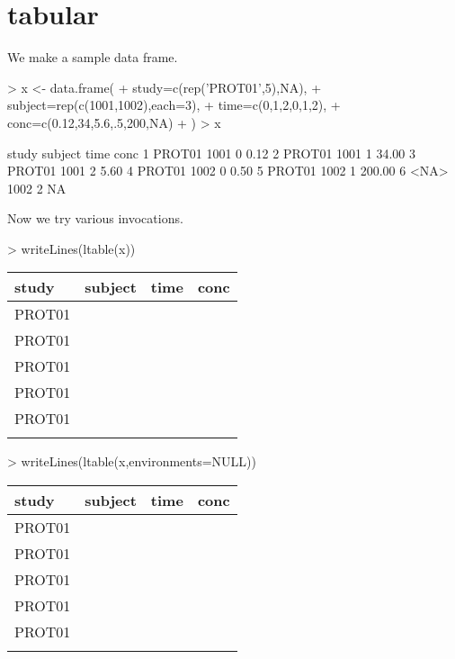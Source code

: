 \documentclass[titlepage]{article}
\begin{document}
\section*{tabular}
We make a sample data frame.
\begin{Schunk}
\begin{Sinput}
> x <- data.frame(
+   study=c(rep('PROT01',5),NA),
+   subject=rep(c(1001,1002),each=3),
+   time=c(0,1,2,0,1,2),
+   conc=c(0.12,34,5.6,.5,200,NA)
+ )
> x
\end{Sinput}
\begin{Soutput}
   study subject time   conc
1 PROT01    1001    0   0.12
2 PROT01    1001    1  34.00
3 PROT01    1001    2   5.60
4 PROT01    1002    0   0.50
5 PROT01    1002    1 200.00
6   <NA>    1002    2     NA
\end{Soutput}
\end{Schunk}
Now we try various invocations.
\begin{Schunk}
\begin{Sinput}
> writeLines(ltable(x))
\end{Sinput}
\begin{table}[!htpb]
 \begin{center}
  \begin{tabular}{lrrr}
    \hline \hline
   study & subject & time & conc \\ \hline
   PROT01 & \verb#1001# & \verb#0# & \verb#0.12# \\
   PROT01 & \verb#1001# & \verb#1# & \verb#34.00# \\
   PROT01 & \verb#1001# & \verb#2# & \verb#5.60# \\
   PROT01 & \verb#1002# & \verb#0# & \verb#0.50# \\
   PROT01 & \verb#1002# & \verb#1# & \verb#200.00# \\
    & \verb#1002# & \verb#2# & \verb## \\ \hline
  \end{tabular}
 \end{center}
\end{table}\end{Schunk}
\begin{Schunk}
\begin{Sinput}
> writeLines(ltable(x,environments=NULL))
\end{Sinput}
\begin{table}[!htpb]
 \begin{tabular}{lrrr}
   \hline \hline
  study & subject & time & conc \\ \hline
  PROT01 & \verb#1001# & \verb#0# & \verb#0.12# \\
  PROT01 & \verb#1001# & \verb#1# & \verb#34.00# \\
  PROT01 & \verb#1001# & \verb#2# & \verb#5.60# \\
  PROT01 & \verb#1002# & \verb#0# & \verb#0.50# \\
  PROT01 & \verb#1002# & \verb#1# & \verb#200.00# \\
   & \verb#1002# & \verb#2# & \verb## \\ \hline
 \end{tabular}
\end{table}\end{Schunk}
\end{document}
